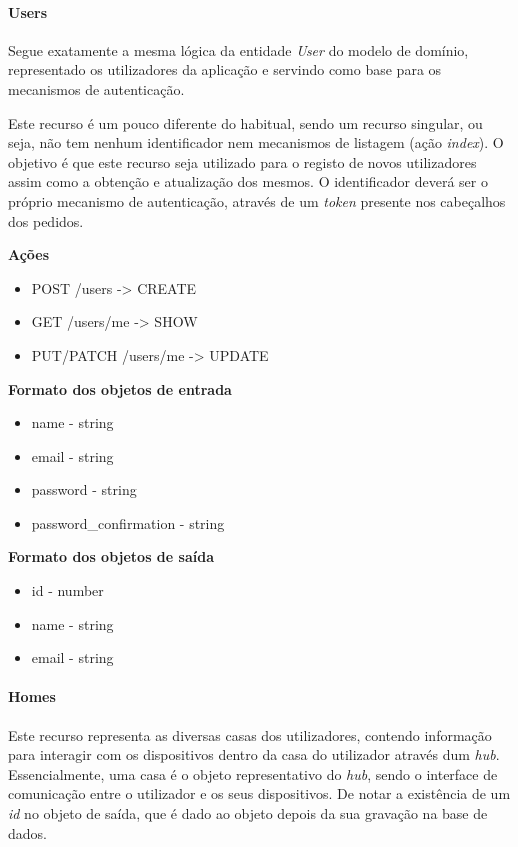 \paragraph*{Users}

Segue exatamente a mesma lógica da entidade \textit{User} do modelo de domínio, representado os utilizadores da aplicação e servindo como base para os mecanismos de autenticação.

Este recurso é um pouco diferente do habitual, sendo um recurso singular, ou seja, não tem nenhum identificador nem mecanismos de listagem (ação \textit{index}). O objetivo é que este recurso seja utilizado para o registo de novos utilizadores assim como a obtenção e atualização dos mesmos. O identificador deverá ser o próprio mecanismo de autenticação, através de um \textit{token} presente nos cabeçalhos dos pedidos.

\textbf{Ações}
\begin{itemize}
    \item POST /users -> CREATE
    \item GET /users/me -> SHOW
    \item PUT/PATCH /users/me -> UPDATE
\end{itemize}

\textbf{Formato dos objetos de entrada}
\begin{itemize}
    \item name - string
    \item email - string
    \item password - string
    \item password{\_}confirmation - string
\end{itemize}

\textbf{Formato dos objetos de saída}
\begin{itemize}
    \item id - number
    \item name - string
    \item email - string
\end{itemize}

\paragraph*{Homes}

Este recurso representa as diversas casas dos utilizadores, contendo informação para interagir com os dispositivos dentro da casa do utilizador através dum \textit{hub}. Essencialmente, uma casa é o objeto representativo do \textit{hub}, sendo o interface de comunicação entre o utilizador e os seus dispositivos. De notar a existência de um \textit{id} no objeto de saída, que é dado ao objeto depois da sua gravação na base de dados.


